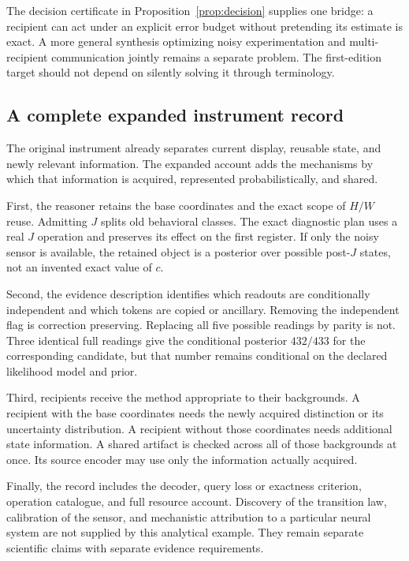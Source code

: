 \documentclass[11pt,letterpaper]{article}
\theoremstyle{plain}
\theoremstyle{definition}
\begin{document}
The decision certificate in Proposition~\ref{prop:decision} supplies one bridge: a recipient can act under an explicit error budget without pretending its estimate is exact. A more general synthesis optimizing noisy experimentation and multi-recipient communication jointly remains a separate problem. The first-edition target should not depend on silently solving it through terminology.

\subsection{A complete expanded instrument record}
The original instrument already separates current display, reusable state, and newly relevant information. The expanded account adds the mechanisms by which that information is acquired, represented probabilistically, and shared.

First, the reasoner retains the base coordinates and the exact scope of $H/W$ reuse. Admitting $J$ splits old behavioral classes. The exact diagnostic plan uses a real $J$ operation and preserves its effect on the first register. If only the noisy sensor is available, the retained object is a posterior over possible post-$J$ states, not an invented exact value of $c$.

Second, the evidence description identifies which readouts are conditionally independent and which tokens are copied or ancillary. Removing the independent flag is correction preserving. Replacing all five possible readings by parity is not. Three identical full readings give the conditional posterior $432/433$ for the corresponding candidate, but that number remains conditional on the declared likelihood model and prior.

Third, recipients receive the method appropriate to their backgrounds. A recipient with the base coordinates needs the newly acquired distinction or its uncertainty distribution. A recipient without those coordinates needs additional state information. A shared artifact is checked across all of those backgrounds at once. Its source encoder may use only the information actually acquired.

Finally, the record includes the decoder, query loss or exactness criterion, operation catalogue, and full resource account. Discovery of the transition law, calibration of the sensor, and mechanistic attribution to a particular neural system are not supplied by this analytical example. They remain separate scientific claims with separate evidence requirements.
\end{document}
